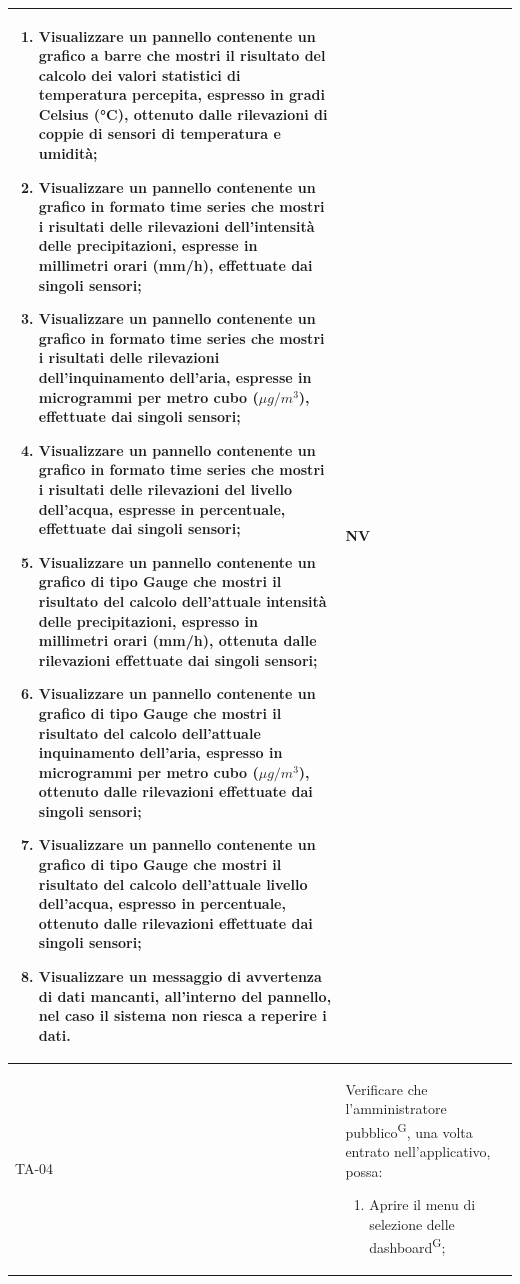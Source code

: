 \documentclass[8pt]{article}
\newcommand{\glossterm}[1]{#1\textsuperscript{G}} %
\begin{document}
\begin{longtable}{|>{\centering}p{2cm}|>{\RaggedRight}m{12cm}|>{\centering\arraybackslash}p{2cm}|}
\begin{enumerate}[start=8]
        \item Visualizzare un pannello contenente un grafico a barre che mostri il risultato
            del calcolo dei valori statistici di temperatura percepita, espresso in gradi Celsius (°C), ottenuto dalle rilevazioni di coppie di sensori di temperatura e umidità;
        \item Visualizzare un pannello contenente un grafico in formato time series che mostri i
            risultati delle rilevazioni dell’intensità delle precipitazioni, espresse in millimetri orari (mm/h), effettuate dai
            singoli sensori;
        \item Visualizzare un pannello contenente un grafico in formato time series che mostri i
            risultati delle rilevazioni dell’inquinamento dell'aria, espresse in microgrammi per metro cubo ($\mu g / m^3$), effettuate dai
            singoli sensori;
        \item Visualizzare un pannello contenente un grafico in formato time series che mostri i
            risultati delle rilevazioni del livello dell'acqua, espresse in percentuale, effettuate dai
            singoli sensori;
        \item Visualizzare un pannello contenente un grafico di tipo Gauge che mostri il risultato
            del calcolo dell'attuale intensità delle precipitazioni, espresso in millimetri orari (mm/h), ottenuta dalle rilevazioni effettuate dai singoli sensori;
        \item Visualizzare un pannello contenente un grafico di tipo Gauge che mostri il risultato
            del calcolo dell'attuale inquinamento dell'aria, espresso in microgrammi per metro cubo ($\mu g / m^3$), ottenuto dalle rilevazioni effettuate dai singoli sensori;
        \item Visualizzare un pannello contenente un grafico di tipo Gauge che mostri il risultato
            del calcolo dell'attuale livello dell'acqua, espresso in percentuale, ottenuto dalle rilevazioni effettuate dai singoli sensori;
        \item Visualizzare un messaggio di avvertenza di dati mancanti, all’interno del pannello, nel caso il sistema non riesca a reperire i dati.
    \end{enumerate}
    & NV \\
    \hline
    TA-04 & Verificare che l’\glossterm{amministratore pubblico}, una volta entrato nell'applicativo, possa:
    \begin{enumerate}
        \setlength\itemsep{0em}
        \item Aprire il menu di selezione delle \glossterm{dashboard};

\end{enumerate}
\end{longtable}
\end{document}
